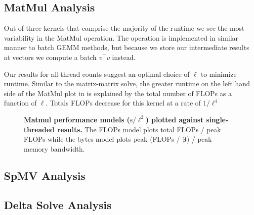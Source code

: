 %
%
%
\subsection{MatMul Analysis}

%
%
%


%
%
%
Out of three kernels that comprise the majority of the runtime we see the most variability in the MatMul operation. 
The operation is implemented in similar manner to batch GEMM methods, but because we store our intermediate results at vectors we compute a batch $v^\intercal v$ instead. 

Our results for all thread counts suggest an optimal choice of $\ell$ to minimize runtime. 
Similar to the matrix-matrix solve, the greater runtime on the left hand side of the MatMul plot in  is explained by the total number of FLOPs as a function of $\ell$. 
Totals FLOPs decrease for this kernel at a rate of $1/\ell^4 $

%
%
%
\begin{figure}
	{\centering 
	}
	\caption{\textbf{Matmul performance models (}$\text{s}/\ell^2$\textbf{) plotted against single-threaded results.} The FLOPs model plots total FLOPs / peak FLOPs while the bytes model plots peak (FLOPs / $\symbf{\beta}$) / peak memory bandwidth. 
	}
	\label{fig:ftmf_comp_1}
\end{figure}


%	

\subsection{SpMV Analysis}

\subsection{Delta Solve Analysis}

%	

